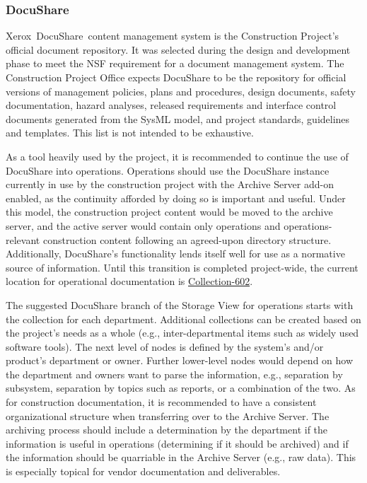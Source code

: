 \subsubsection{DocuShare}

Xerox\textregistered\ DocuShare\textregistered\ content management system \citep{DocuShare-cite} is the Construction Project's official document repository.
It was selected during the design and development phase to meet the NSF requirement for a document management system.
The Construction Project Office expects DocuShare to be the repository for official versions of management policies, plans and procedures, design documents, safety documentation, hazard analyses, released requirements and interface control documents generated from the SysML model, and project standards, guidelines and templates.
This list is not intended to be exhaustive.

As a tool heavily used by the project, it is recommended to continue the use of DocuShare into operations.
Operations should use the DocuShare instance currently in use by the construction project with the Archive Server add-on enabled, as the continuity afforded by doing so is important and useful.
Under this model, the construction project content would be moved to the archive server, and the active server would contain only operations and operations-relevant construction content following an agreed-upon directory structure.
Additionally, DocuShare's functionality lends itself well for use as a normative source of information.
Until this transition is completed project-wide, the current location for operational documentation is \href{https://docushare.lsstcorp.org/docushare/dsweb/View/Collection-602}{Collection-602}.

The suggested DocuShare branch of the Storage View for operations starts with the collection for each department.
Additional collections can be created based on the project's needs as a whole (e.g., inter-departmental items such as widely used software tools).
The next level of nodes is defined by the system's and/or product's department or owner.
Further lower-level nodes would depend on how the department and owners want to parse the information, e.g., separation by subsystem, separation by topics such as reports, or a combination of the two.
As for construction documentation, it is recommended to have a consistent organizational structure when transferring over to the Archive Server.
The archiving process should include a determination by the department if the information is useful in operations (determining if it should be archived) and if the information should be quarriable in the Archive Server (e.g., raw data).
This is especially topical for vendor documentation and deliverables.

